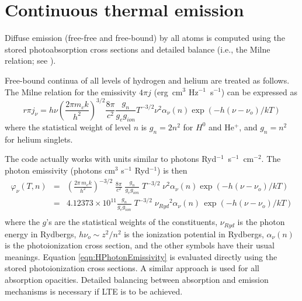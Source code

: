\section{Continuous thermal emission}

Diffuse emission (free-free and free-bound) by all atoms is computed using
the stored photoabsorption cross sections and detailed balance (i.e., the
Milne relation; see \citealp{Mihalas1978}).

Free-bound continua of all levels of hydrogen and helium are treated as
follows.  The Milne relation for the emissivity $4\pi j$ (erg~cm$^3$
Hz$^{-1}$~s$^{-1}$) can
be expressed as \citep{Brown1970}
\begin{equation}
r\pi j_\nu = h\nu \left(\frac{2\pi m_ck}{h^2}\right)^{3/2} \frac{8\pi}{c^2}
\frac{g_n}{g_eg_{ion}} T^{-3/2}\nu^2 \alpha_\nu (n) \exp
\left(-h(\nu-\nu_o)/kT\right)
\end{equation}
where the statistical weight of level $n$ is $g_n = 2n^2$ for $H^0$ and
He$^+$, and
$g_n = n^2$ for helium singlets.

The code actually works with units similar to photons
Ryd$^{-1}$~s$^{-1}$~cm$^{-2}$.  The
photon emissivity (photons cm$^3$ s$^{-1}$ Ryd$^{-1}$) is then
\begin{equation}
\label{eqn:HPhotonEmissivity}
\begin{array}{ccc}
 {\varphi _\nu }\left( {T,n} \right)&  =& {\left( {\frac{{2\pi
\,{m_e}k}}{{{h^2}}}} \right)^{ - 3/2}}\;\frac{{8\pi
}}{{{c^2}}}\;\frac{{{g_n}}}{{{g_e}{g_{ion}}}}\;{T^{ - 3/2}}\;{\nu ^2}{\alpha
_\nu }\left( n \right)\exp \left( { - h\left( {\nu  - {\nu _o}} \right)/kT}
\right) \\
&=& 4.12373 \times {10^{11}}\frac{{{g_n}}}{{{g_e}{g_{ion}}}}\;{T^{ -
3/2}}\;{\nu _{Ryd}}^2{\alpha _\nu }\left( n \right)\,\exp \left( { - h\left(
{\nu  - {\nu _o}} \right)/kT} \right) \\
 \end{array}
\end{equation}
where the $g$'s are the statistical weights of the constituents, $\nu_{Ryd}$ is the
photon energy in Rydbergs, $h\nu_o\sim z^2/n^2$ is the ionization potential in Rydbergs,
$\alpha_\nu(n)$ is the photoionization cross section, and the other symbols have their
usual meanings.
Equation \ref{eqn:HPhotonEmissivity} is evaluated directly using the stored
photoionization cross sections.  A similar approach is used for all
absorption opacities.  Detailed balancing between absorption and emission
mechanisms is necessary if LTE is to be achieved.

